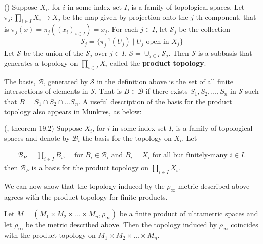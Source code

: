 \begin{definition-proposition} 
	(\cite{mun}) Suppose $X_i$, for $i$ in some index set $I$, is a family of topological spaces.  Let $\pi_j: \prod_{i \in I} X_i \rightarrow X_j$ be the map given by projection onto the $j$-th component, that is $\pi_j (x) = \pi_j ((x_i)_{i \in I}) = x_j$. For each $j \in I$, let $\mathcal{S}_j$ be the collection \[\mathcal{S}_j = \{\pi^{-1}_j (U_j)\mid U_j \text{ open in } X_j\}\] Let $\mathcal{S}$ be the union of the $\mathcal{S}_j$ over $j \in I$, $\mathcal{S}= \cup_{j \in I} \mathcal{S}_j$. Then $\mathcal{S}$ is a subbasis that generates a topology on  $\prod_{i \in I} X_i$ called the \textbf{product topology}.\\
\end{definition-proposition}


The basis, $\mathcal{B}$, generated by $\mathcal{S}$ in the definition above is the set of all finite intersections of elements in $\mathcal{S}$. That is $B \in \mathcal{B}$ if there exists $S_1, S_2, \ldots, S_n$ in $\mathcal{S}$ such that $B = S_1 \cap S_2 \cap \ldots S_n$.  A useful description of the basis for the product topology also appears in Munkres, as below:\\

\begin{proposition} 
	(\cite{mun}, theorem 19.2) Suppose $X_i$, for $i$ in some index set $I$, is a family of topological spaces and denote by $\mathcal{B}_i$ the basis for the topology on $X_i$. Let 
	
	\begin{align*}
	\mathcal{B}_P = \prod_{i \in I} B_i, & \text{ for }  B_i \in \mathcal{B}_i \text { and } B_i = X_i \text{ for all but finitely-many } i \in I. 
	\end{align*}
	then $\mathcal{B}_P$ is a basis for the product topology on $\prod_{i \in I} X_i$.\\
	
\end{proposition}

We can now show that the topology induced by the $\rho_\infty$ metric described above agrees with the product topology for finite products.\\

\begin{proposition}
	Let $M=(M_{1} \times M_{2} \times \ldots \times M_{n},\rho_\infty)$ be a finite product of ultrametric spaces and let $\rho_\infty$ be the metric described above.  Then the topology induced by $\rho_\infty$ coincides with the product topology on $M_{1} \times M_{2} \times \ldots \times M_{n}$.
\end{proposition}

